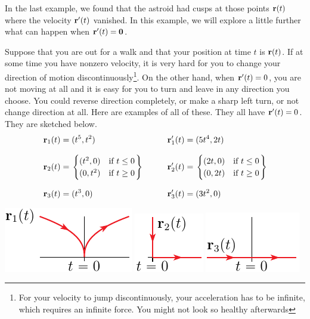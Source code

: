 \begin{eg}\label{eg:zeroSpeed}
In the last example, we found that the astroid  had
cusps at those points $\mathbf{r}(t)$ where the velocity $\mathbf{r}'(t)$ vanished.
In this example, we will explore a little further what can happen when
$\mathbf{r}'(t)=\mathbf{0}$. 

Suppose that you are out for a walk and that your position
at time $t$ is $\mathbf{r}(t)$. If at some time you have nonzero velocity,
it is very hard for you to  change your direction of motion 
discontinuously\footnote{For your velocity to jump
discontinuously, your acceleration has to be infinite, which requires an 
infinite force. You might not look so healthy afterwards}. On the other hand, when 
$\mathbf{r}'(t)=0$, you are not moving at all and it is easy for you to turn and
leave in any direction you choose. You could reverse direction completely,
or make a sharp left turn, or not change direction at all. Here are examples 
of all of these. They all have $\mathbf{r}'(t)=0$. They are sketched below.
\begin{alignat*}{3}
\mathbf{r}_1(t) &= (t^5, t^2) &
\mathbf{r}_1'(t)&= (5t^4, 2t) 
\\[0.1in]
\mathbf{r}_2(t) &= \left.\begin{cases} (t^2, 0) & \text{if $t\le 0$} \\
                        (0 , t^2) & \text{if $t\ge 0$}
          \end{cases}\right\}\qquad &
\mathbf{r}_2'(t)&= \left.\begin{cases} (2t, 0) & \text{if $t\le 0$} \\
                        (0 , 2t) & \text{if $t\ge 0$}
          \end{cases} \right\}
\\[0.1in]
\mathbf{r}_3(t) &= (t^3, 0) &
\mathbf{r}_3'(t) &= (3t^2, 0) 
\end{alignat*}
\begin{efig}
\begin{center}
     \includegraphics{cuspA.pdf}\qquad\qquad
     \includegraphics{cuspB.pdf}\qquad\qquad
     \includegraphics{nocusp.pdf}
\end{center}
\end{efig}


\end{eg}

